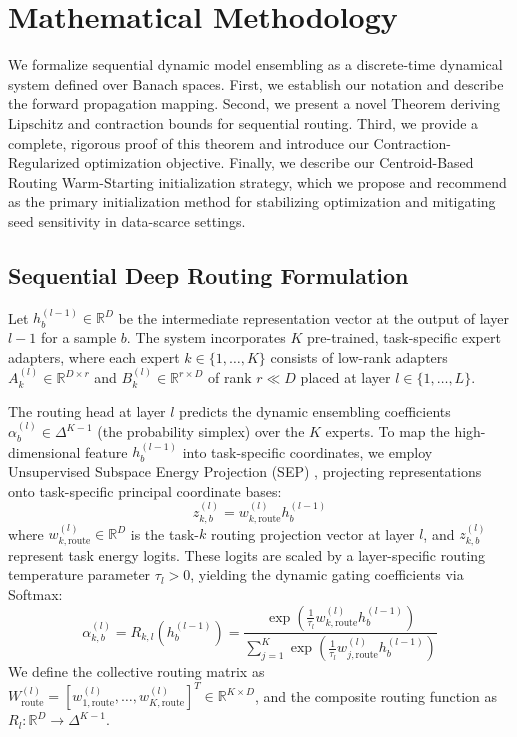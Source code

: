 \section{Mathematical Methodology}
\label{sec:methodology}

We formalize sequential dynamic model ensembling as a discrete-time dynamical system defined over Banach spaces. First, we establish our notation and describe the forward propagation mapping. Second, we present a novel Theorem deriving Lipschitz and contraction bounds for sequential routing. Third, we provide a complete, rigorous proof of this theorem and introduce our Contraction-Regularized optimization objective. Finally, we describe our Centroid-Based Routing Warm-Starting initialization strategy, which we propose and recommend as the primary initialization method for stabilizing optimization and mitigating seed sensitivity in data-scarce settings.

\subsection{Sequential Deep Routing Formulation}
Let $h^{(l-1)}_b \in \mathbb{R}^D$ be the intermediate representation vector at the output of layer $l-1$ for a sample $b$. The system incorporates $K$ pre-trained, task-specific expert adapters, where each expert $k \in \{1, \dots, K\}$ consists of low-rank adapters $A_k^{(l)} \in \mathbb{R}^{D \times r}$ and $B_k^{(l)} \in \mathbb{R}^{r \times D}$ of rank $r \ll D$ placed at layer $l \in \{1, \dots, L\}$. 

The routing head at layer $l$ predicts the dynamic ensembling coefficients $\alpha^{(l)}_b \in \Delta^{K-1}$ (the probability simplex) over the $K$ experts. To map the high-dimensional feature $h^{(l-1)}_b$ into task-specific coordinates, we employ Unsupervised Subspace Energy Projection (SEP) \cite{subspaceenergy2024sep}, projecting representations onto task-specific principal coordinate bases:
\begin{equation}
z^{(l)}_{k, b} = w_{k, \text{route}}^{(l)} h^{(l-1)}_b
\end{equation}
where $w_{k, \text{route}}^{(l)} \in \mathbb{R}^D$ is the task-$k$ routing projection vector at layer $l$, and $z^{(l)}_{k, b}$ represent task energy logits. These logits are scaled by a layer-specific routing temperature parameter $\tau_l > 0$, yielding the dynamic gating coefficients via Softmax:
\begin{equation}
\label{eq:softmax}
\alpha^{(l)}_{k, b} = R_{k, l}\left(h^{(l-1)}_b\right) = \frac{\exp\left( \frac{1}{\tau_l} w_{k, \text{route}}^{(l)} h^{(l-1)}_b \right)}{\sum_{j=1}^K \exp\left( \frac{1}{\tau_l} w_{j, \text{route}}^{(l)} h^{(l-1)}_b \right)}
\end{equation}
We define the collective routing matrix as $W_{\text{route}}^{(l)} = \left[ w_{1, \text{route}}^{(l)}, \dots, w_{K, \text{route}}^{(l)} \right]^T \in \mathbb{R}^{K \times D}$, and the composite routing function as $R_l: \mathbb{R}^D \to \Delta^{K-1}$.

